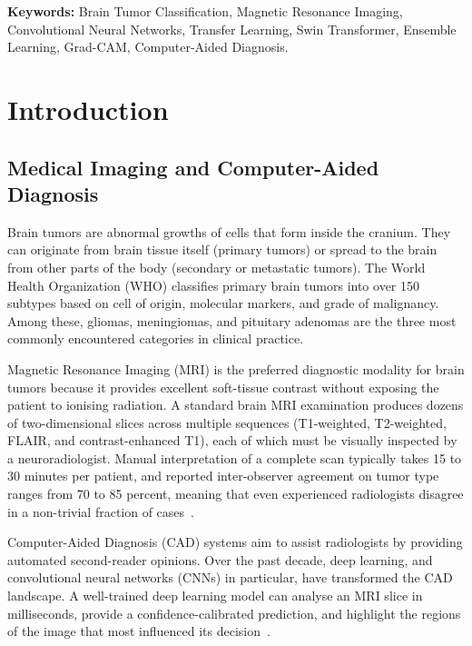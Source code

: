 \documentclass[12pt,a4paper,oneside]{report}
\begin{document}
\vspace{0.5cm}
\textbf{Keywords:} Brain Tumor Classification, Magnetic Resonance Imaging,
Convolutional Neural Networks, Transfer Learning, Swin Transformer,
Ensemble Learning, Grad-CAM, Computer-Aided Diagnosis.

\tableofcontents
\listoffigures
\listoftables
\clearpage
{}

\chapter{Introduction}

\section{Medical Imaging and Computer-Aided Diagnosis}

Brain tumors are abnormal growths of cells that form inside the cranium. They can originate from brain tissue itself (primary tumors) or spread to the brain from other parts of the body (secondary or metastatic tumors). The World Health Organization (WHO) classifies primary brain tumors into over 150 subtypes based on cell of origin, molecular markers, and grade of malignancy. Among these, gliomas, meningiomas, and pituitary adenomas are the three most commonly encountered categories in clinical practice.

Magnetic Resonance Imaging (MRI) is the preferred diagnostic modality for brain tumors because it provides excellent soft-tissue contrast without exposing the patient to ionising radiation. A standard brain MRI examination produces dozens of two-dimensional slices across multiple sequences (T1-weighted, T2-weighted, FLAIR, and contrast-enhanced T1), each of which must be visually inspected by a neuroradiologist. Manual interpretation of a complete scan typically takes 15 to 30 minutes per patient, and reported inter-observer agreement on tumor type ranges from 70 to 85 percent, meaning that even experienced radiologists disagree in a non-trivial fraction of cases~\cite{bouhafra2025}.

Computer-Aided Diagnosis (CAD) systems aim to assist radiologists by providing automated second-reader opinions. Over the past decade, deep learning, and convolutional neural networks (CNNs) in particular, have transformed the CAD landscape. A well-trained deep learning model can analyse an MRI slice in milliseconds, provide a confidence-calibrated prediction, and highlight the regions of the image that most influenced its decision~\cite{ranjbarzadeh2025}.
\end{document}
